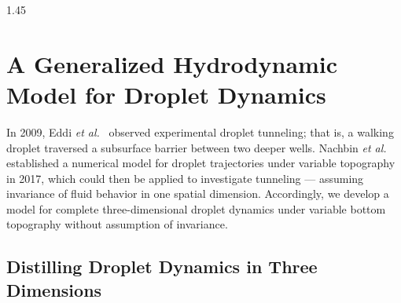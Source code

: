 \documentclass[12pt,titlepage]{article}
\theoremstyle{definition}
\theoremstyle{remark}
\begin{document}
\begin{spacing}{1.45}
\section{A Generalized Hydrodynamic Model for Droplet Dynamics}
\label{sec3}

In 2009, Eddi \textit{et al.}\ \cite{eddi2009unpredictable} observed experimental droplet tunneling; that is, a walking droplet traversed a subsurface barrier between two deeper wells. Nachbin \textit{et al.}\ \cite{nachbin2017tunneling} established a numerical model for droplet trajectories under variable topography in 2017, which could then be applied to investigate tunneling --- assuming invariance of fluid behavior in one spatial dimension. Accordingly, we develop a model for complete three-dimensional droplet dynamics under variable bottom topography without assumption of invariance.

\subsection{Distilling Droplet Dynamics in Three Dimensions}


\end{spacing}
\end{document}
